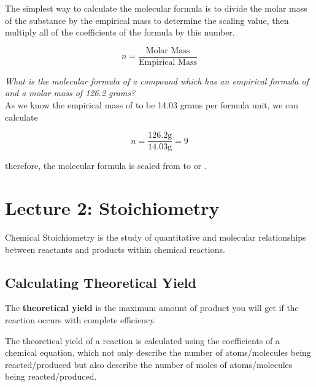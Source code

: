 \noindent
The simplest way to calculate the molecular formula is to divide the molar mass of the substance by the empirical mass to determine the scaling value, then multiply all of the coefficients of the formula by this number.

\begin{equation}
n = \frac{\text{Molar Mass}}{\text{Empirical Mass}}
\end{equation}


\begin{example}
\textit{What is the molecular formula of a compound which has an empirical formula of  and a molar mass of 126.2 grams?} \\

\noindent
As we know the empirical mass of  to be 14.03 grams per formula unit, we can calculate

$$n = \frac{126.2 \mathrm{g}}{14.03 \mathrm{g}} = 9$$

\noindent
therefore, the molecular formula is scaled from  to  or .
\end{example}

\section{Lecture 2: Stoichiometry}

\begin{defn}
Chemical Stoichiometry is the study of quantitative and molecular relationships between reactants and products within chemical reactions.
\end{defn}

\subsection{Calculating Theoretical Yield}

\begin{defn}
The \textbf{theoretical yield} is the maximum amount of product you will get if the reaction occurs with complete efficiency.
\end{defn}

\noindent
The theoretical yield of a reaction is calculated using the coefficients of a chemical equation, which not only describe the number of atoms/molecules being reacted/produced but also describe the number of moles of atoms/molecules being reacted/produced.

